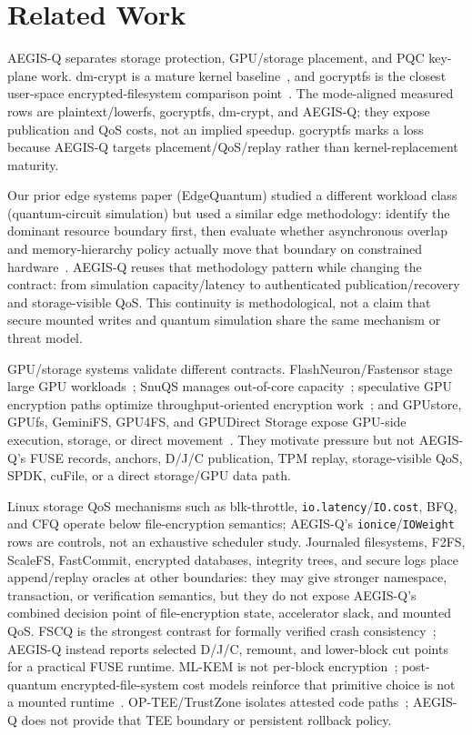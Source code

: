 \section{Related Work}
\label{sec:related_work}
\label{sec:related_sim}

AEGIS-Q separates storage protection, GPU/storage placement, and PQC key-plane work.  dm-crypt is a mature kernel baseline~\cite{dmcrypt}, and gocryptfs is the closest user-space encrypted-filesystem comparison point~\cite{gocryptfs}.  The mode-aligned measured rows are plaintext/lowerfs, gocryptfs, dm-crypt, and AEGIS-Q; they expose publication and QoS costs, not an implied speedup.  gocryptfs marks a loss because AEGIS-Q targets placement/QoS/replay rather than kernel-replacement maturity.

Our prior edge systems paper (EdgeQuantum) studied a different workload class (quantum-circuit simulation) but used a similar edge methodology: identify the dominant resource boundary first, then evaluate whether asynchronous overlap and memory-hierarchy policy actually move that boundary on constrained hardware~\cite{edgeqsim}.  AEGIS-Q reuses that methodology pattern while changing the contract: from simulation capacity/latency to authenticated publication/recovery and storage-visible QoS.  This continuity is methodological, not a claim that secure mounted writes and quantum simulation share the same mechanism or threat model.

GPU/storage systems validate different contracts.  FlashNeuron/Fastensor stage large GPU workloads~\cite{flashneuron, fastensor}; SnuQS manages out-of-core capacity~\cite{snuqs_storage}; speculative GPU encryption paths optimize throughput-oriented encryption work~\cite{spec_gpu_cfs}; and GPUstore, GPUfs, GeminiFS, GPU4FS, and GPUDirect Storage expose GPU-side execution, storage, or direct movement~\cite{gpustore,gpufs,geminifs,gpu4fs,gpudirect_storage}.  They motivate pressure but not AEGIS-Q's FUSE records, anchors, D/J/C publication, TPM replay, storage-visible QoS, SPDK, cuFile, or a direct storage/GPU data path.

Linux storage QoS mechanisms such as blk-throttle, \texttt{io.latency}/\texttt{IO.cost}, BFQ, and CFQ operate below file-encryption semantics; AEGIS-Q's \texttt{ionice}/\texttt{IOWeight} rows are controls, not an exhaustive scheduler study.  Journaled filesystems, F2FS, ScaleFS, FastCommit, encrypted databases, integrity trees, and secure logs place append/replay oracles at other boundaries: they may give stronger namespace, transaction, or verification semantics, but they do not expose AEGIS-Q's combined decision point of file-encryption state, accelerator slack, and mounted QoS.  FSCQ is the strongest contrast for formally verified crash consistency~\cite{fscq}; AEGIS-Q instead reports selected D/J/C, remount, and lower-block cut points for a practical FUSE runtime.  ML-KEM is not per-block encryption~\cite{mlkem}; post-quantum encrypted-file-system cost models reinforce that primitive choice is not a mounted runtime~\cite{pppqefs}.  OP-TEE/TrustZone isolates attested code paths~\cite{optee}; AEGIS-Q does not provide that TEE boundary or persistent rollback policy.

